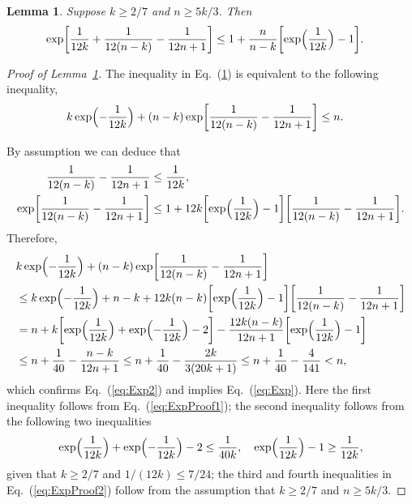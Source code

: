 \documentclass[aop]{imsart}
\theoremstyle{plain}
\newtheorem{lemma}[theorem]{Lemma}
\theoremstyle{remark}
\newcommand{\1}{\operatorname{\uppercase\expandafter{\romannumeral1}}}
\newcommand{\2}{\operatorname{\uppercase\expandafter{\romannumeral2}}}
\newcommand{\3}{\operatorname{\uppercase\expandafter{\romannumeral3}}}
\newcommand{\4}{\operatorname{\uppercase\expandafter{\romannumeral4}}}
\newcommand{\5}{\operatorname{\uppercase\expandafter{\romannumeral5}}}
\newcommand{\6}{\operatorname{\uppercase\expandafter{\romannumeral6}}}
\newcommand{\7}{\operatorname{\uppercase\expandafter{\romannumeral7}}}
\newcommand{\8}{\operatorname{\uppercase\expandafter{\romannumeral8}}}
\newcommand{\9}{\operatorname{\uppercase\expandafter{\romannumeral9}}}
\newcommand{\eref}[1]{Eq.~\textup{(\ref{#1})}}
\newcommand{\lref}[1]{Lemma~\ref{#1}}
\begin{document}
\begin{appendix}
\begin{lemma}\label{lem:Exp}
	Suppose $k\geq 2/7$ and $n\geq 5k/3$. Then 
	\begin{align}
	\exp\biggl[\frac{1}{12 k}+\frac{1}{12(n-k)}-\frac{1}{12n+1}\biggr]
	&\leq1+ \frac{n}{n-k} \biggl[\exp\Bigl(\frac{1}{12 k}\Bigr)-1\biggr]. \label{eq:Exp}
	\end{align}
\end{lemma}
\begin{proof}[Proof of \lref{lem:Exp}]
	The inequality in \eref{lem:Exp} is equivalent to the following inequality,
	\begin{align}
	k\exp\Bigl(-\frac{1}{12 k}\Bigr)+(n-k)\exp\biggl[\frac{1}{12(n-k)}-\frac{1}{12n+1}\biggr]
	&\leq n. \label{eq:Exp2}
	\end{align}
	

	
	By assumption we can deduce that 
	\begin{align}
	\frac{1}{12(n-k)}-\frac{1}{12n+1}&\leq \frac{1}{12k},\\ 
	\exp\biggl[\frac{1}{12(n-k)}-\frac{1}{12n+1}\biggr]&\leq 1+ 12k\biggl[\exp\Bigl(\frac{1}{12k}\Bigr)-1\biggr]\biggl[\frac{1}{12(n-k)}-\frac{1}{12n+1}\biggr].\label{eq:ExpProof1}
	\end{align}
	Therefore, 
	\begin{align}\label{eq:ExpProof2}
	&k\exp\Bigl(-\frac{1}{12 k}\Bigr)+(n-k)\exp\biggl[\frac{1}{12(n-k)}-\frac{1}{12n+1}\biggr]\\
	&\leq k\exp\Bigl(-\frac{1}{12 k}\Bigr)+n-k+12k(n-k)\biggl[\exp\Bigl(\frac{1}{12k}\Bigr)-1\biggr]\biggl[\frac{1}{12(n-k)}-\frac{1}{12n+1}\biggr]\nonumber\\
	&=n+k\biggl[\exp\Bigl(\frac{1}{12 k}\Bigr)+\exp\Bigl(-\frac{1}{12 k}\Bigr)-2\biggr]-\frac{12k(n-k)}{12n+1}\biggl[\exp\Bigl(\frac{1}{12 k}\Bigr)-1\biggr]\nonumber\\
	&\leq n+ \frac{1}{40}-\frac{n-k}{12n+1}\leq n+ \frac{1}{40}-\frac{2k}{3(20k+1)} \leq n+ \frac{1}{40}-\frac{4}{141}<n,    \nonumber
	\end{align}
	which confirms \eref{eq:Exp2} and implies \eref{eq:Exp}. Here the first inequality follows from \eref{eq:ExpProof1}; the
second inequality follows from the following two inequalities 
	\begin{align}
	\exp\Bigl(\frac{1}{12 k}\Bigr)+\exp\Bigl(-\frac{1}{12 k}\Bigr)-2\leq \frac{1}{40 k},\quad \exp\Bigl(\frac{1}{12 k}\Bigr)-1\geq \frac{1}{12 k},
	\end{align}
	given that $k\geq 2/7$ and $1/(12k)\leq 7/24$;  the third and fourth inequalities in \eref{eq:ExpProof2} follow from the assumption that $k\geq 2/7$ and $n\geq 5k/3$.
\end{proof}


\end{appendix}
\end{document}
